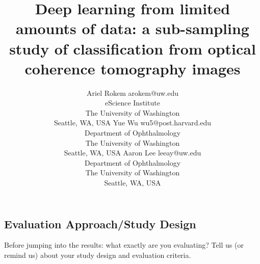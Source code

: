 \documentclass[twoside,11pt]{article}
\begin{document}
\title{Deep learning from limited amounts of data: a sub-sampling study of classification from optical coherence tomography images}

\author{\name Ariel Rokem \email arokem@uw.edu \\
       \addr eScience Institute\\
       The University of Washington\\
       Seattle, WA, USA
       \AND
       \name Yue Wu  \email wu5@post.harvard.edu \\
       \addr Department of Ophthalmology\\
       The University of Washington\\
       Seattle, WA, USA
       \AND
      \name Aaron Lee \email leeay@uw.edu\\
      \addr Department of Ophthalmology\\
      The University of Washington\\
      Seattle, WA, USA}

\maketitle






\subsection{Evaluation Approach/Study Design}

Before jumping into the results: what exactly are you evaluating?
Tell us (or remind us) about your study design and evaluation
criteria.





\end{document}
